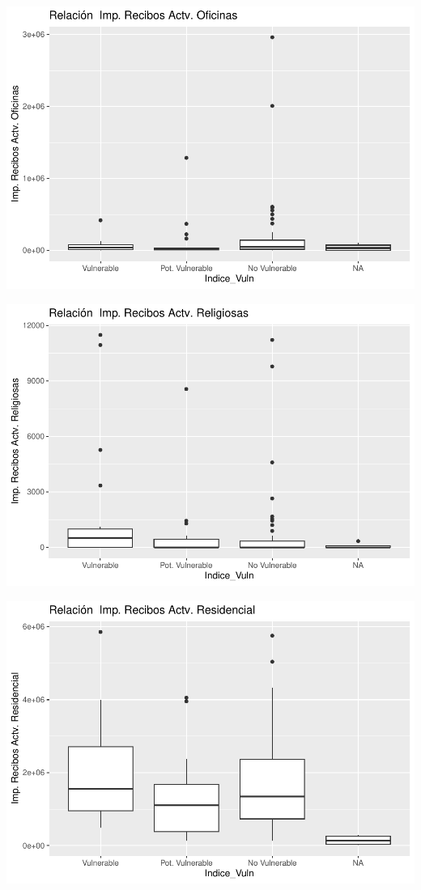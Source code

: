 \documentclass[notspecified,article,submit,moreauthors,pdftex]{Definitions/mdpi}
\begin{document}
\begin{center}\includegraphics{./figure/unnamed-chunk-23-29} \end{center}

\begin{center}\includegraphics{./figure/unnamed-chunk-23-30} \end{center}

\begin{center}\includegraphics{./figure/unnamed-chunk-23-31} \end{center}
\end{document}
